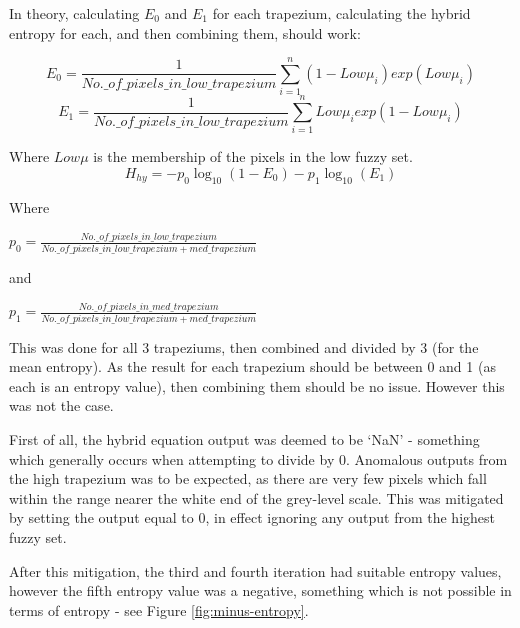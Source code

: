 In theory, calculating $E_0$ and $E_1$ for each trapezium, calculating the hybrid entropy for each, and then combining them, should work:

\begin{equation}
E_0 = \frac{1}{No.\_of\_pixels\_in\_low\_trapezium}\displaystyle\sum_{i=1}^{n}{(1-Low\mu_i)exp(Low\mu_i)}
\end{equation}
\begin{equation}
E_1 = \frac{1}{No.\_of\_pixels\_in\_low\_trapezium}\displaystyle\sum_{i=1}^{n}{Low\mu_iexp(1-Low\mu_i)}
\end{equation}

Where $Low\mu$ is the membership of the pixels in the low fuzzy set.
\begin{equation}
H_{hy} = -p_0\log_{10}(1 - E_0) - p_1\log_{10}(E_1)
\end{equation}

Where

$p_0 = \frac{No.\_of\_pixels\_in\_low\_trapezium}{No.\_of\_pixels\_in\_low\_trapezium + med\_trapezium}$

and

$p_1 = \frac{No.\_of\_pixels\_in\_med\_trapezium}{No.\_of\_pixels\_in\_low\_trapezium + med\_trapezium}$


This was done for all 3 trapeziums, then combined and divided by 3 (for the mean entropy). As the result for each trapezium should be between 0 and 1 (as each is an entropy value), then combining them should be no issue. However this was not the case.

First of all, the hybrid equation output was deemed to be `NaN' - something which generally occurs when attempting to divide by 0. Anomalous outputs from the high trapezium was to be expected, as there are very few pixels which fall within the range nearer the white end of the grey-level scale. This was mitigated by setting the output equal to 0, in effect ignoring any output from the highest fuzzy set.

After this mitigation, the third and fourth iteration had suitable entropy values, however the fifth entropy value was a negative, something which is not possible in terms of entropy - see Figure \ref{fig:minus-entropy}.

